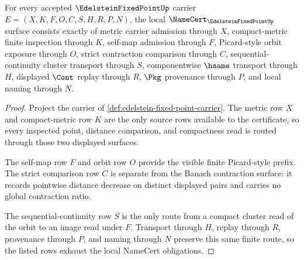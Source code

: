 \begin{theorem}\label{thm:edelstein-fixed-point-namecert-obligations}
For every accepted $\EdelsteinFixedPointUp$ carrier $E=(X,K,F,O,C,S,H,R,P,N)$, the local $\NameCert_{\EdelsteinFixedPointUp}$ surface consists exactly of metric carrier admission through $X$, compact-metric finite inspection through $K$, self-map admission through $F$, Picard-style orbit exposure through $O$, strict contraction comparison through $C$, sequential-continuity cluster transport through $S$, componentwise $\hsame$ transport through $H$, displayed $\Cont$ replay through $R$, $\Pkg$ provenance through $P$, and local naming through $N$.
\end{theorem}
\begin{proof}
Project the carrier of \autoref{def:edelstein-fixed-point-carrier}. The metric row $X$ and compact-metric row $K$ are the only source rows available to the certificate, so every inspected point, distance comparison, and compactness read is routed through those two displayed surfaces.

The self-map row $F$ and orbit row $O$ provide the visible finite Picard-style prefix. The strict comparison row $C$ is separate from the Banach contraction surface: it records pointwise distance decrease on distinct displayed pairs and carries no global contraction ratio.

The sequential-continuity row $S$ is the only route from a compact cluster read of the orbit to an image read under $F$. Transport through $H$, replay through $R$, provenance through $P$, and naming through $N$ preserve this same finite route, so the listed rows exhaust the local NameCert obligations.
\end{proof}

